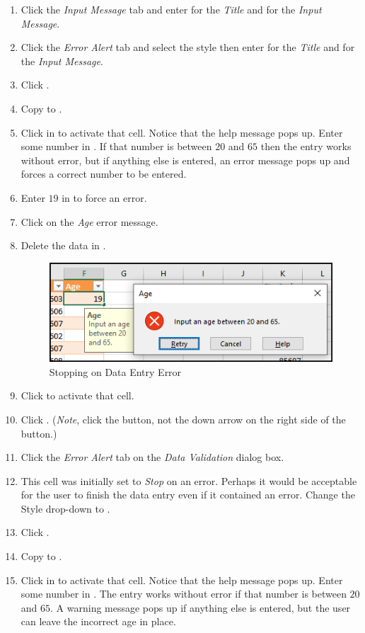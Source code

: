 \begin{enumbox}
\begin{enumerate}
		\item Click the \textit{Input Message} tab and enter  for the \textit{Title} and  for the \textit{Input Message}.
		\item Click the \textit{Error Alert} tab and select the  style then enter  for the \textit{Title} and  for the \textit{Input Message}.
		\item Click .
		\item Copy  to .
		\item Click in  to activate that cell. Notice that the help message pops up. Enter some number in . If that number is between $ 20 $ and $ 65 $ then the entry works without error, but if anything else is entered, an error message pops up and forces a correct number to be entered.
		\item Enter $ 19 $ in  to force an error.
		\item Click  on the \textit{Age} error message.
		\item Delete the data in .

		\begin{figure}[H]
			\centering
			\includegraphics[width=\maxwidth{.75\linewidth}]{gfx/ch07_fig40}
			\caption{Stopping on Data Entry Error}
			\label{07:fig40}
		\end{figure}

		\item Click  to activate that cell.
		\item Click . (\textit{Note}, click the button, not the down arrow on the right side of the button.)
		\item Click the \textit{Error Alert} tab on the \textit{Data Validation} dialog box. 
		\item This cell was initially set to \textit{Stop} on an error. Perhaps it would be acceptable for the user to finish the data entry even if it contained an error. Change the Style drop-down to .
		\item Click .
		\item Copy  to .
		\item Click in  to activate that cell. Notice that the help message pops up. Enter some number in . The entry works without error if that number is between $ 20 $ and $ 65 $. A warning message pops up if anything else is entered,  but the user can leave the incorrect age in place.


\end{enumerate}
\end{enumbox}
